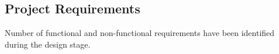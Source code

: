 \subsection{Project Requirements} \label{label:projectRequirements}
Number of functional and non-functional requirements have been identified during the design stage. 